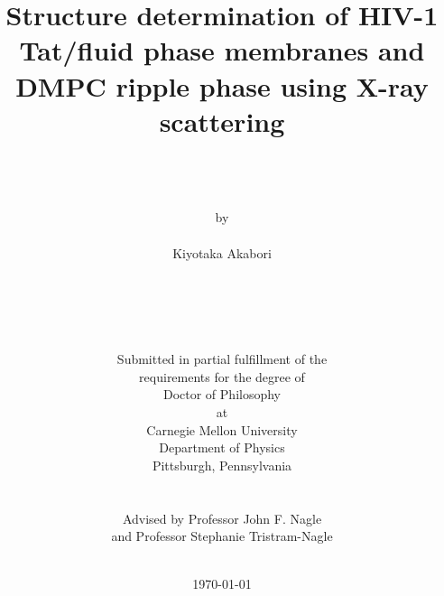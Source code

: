 \documentclass[12pt,twoside]{report}
\author{\\
	\\
	\\
	by \\
	\\
      	Kiyotaka Akabori \\
	\\
	\\
	\\
	\\
	\\
        Submitted in partial fulfillment of the \\
        requirements for the degree of \\
        Doctor of Philosophy \\
        at \\
        Carnegie Mellon University \\
        Department of Physics \\
        Pittsburgh, Pennsylvania \\
	\\
        \\
	Advised by Professor John F. Nagle \\
	and 
	Professor Stephanie Tristram-Nagle
	\\
	\\
}
\title{\bf{
Structure determination of HIV-1 Tat/fluid phase membranes
and DMPC ripple phase using X-ray scattering
}}
\date{\today}
\begin{document}
 




\maketitle



%




%

\tableofcontents 

\listoftables

\listoffigures

\printglossaries

\clearpage 






\begin{appendices}
  
\end{appendices}



%
\end{document}
